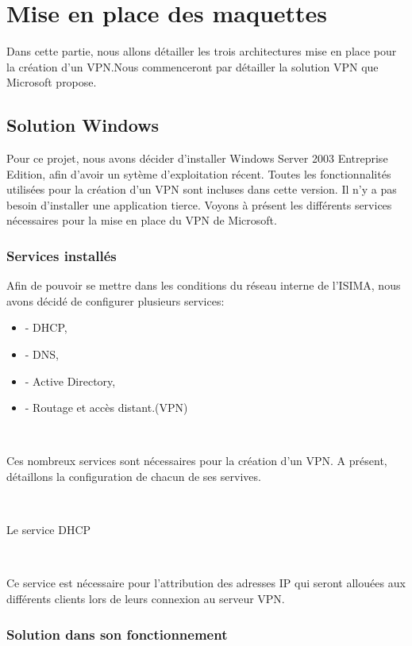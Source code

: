 \section{Mise en place des maquettes}

	Dans cette partie, nous allons détailler les trois architectures mise en place pour la création d'un VPN.Nous commenceront par détailler la solution VPN que Microsoft propose.

\subsection{Solution Windows}

	Pour ce projet, nous avons décider d'installer Windows Server 2003 Entreprise Edition, afin d'avoir un sytème d'exploitation récent. Toutes les fonctionnalités utilisées pour la création d'un VPN sont incluses dans cette version. Il n'y a pas besoin d'installer une application tierce.
	Voyons à présent les différents services nécessaires pour la mise en place du VPN de Microsoft.

\subsubsection{Services installés}

	Afin de pouvoir se mettre dans les conditions du réseau interne de l'ISIMA, nous avons décidé de configurer plusieurs services:
~


\begin{itemize}
	\item  - DHCP,
	\item  - DNS, 
	\item  - Active Directory,
	\item  - Routage et accès distant.(VPN)
\end{itemize}
~	

	Ces nombreux services sont nécessaires pour la création d'un VPN. A présent, détaillons la configuration de chacun de ses servives.

~

	Le service DHCP

~

Ce service est nécessaire pour l'attribution des adresses IP qui seront allouées aux différents clients lors de leurs connexion au serveur VPN.

\subsubsection{Solution dans son fonctionnement}
